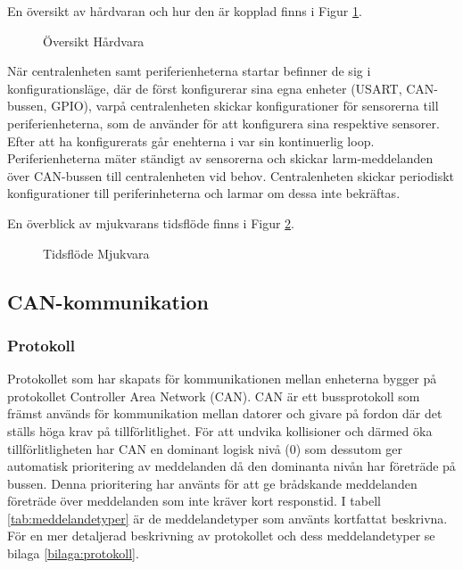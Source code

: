 \documentclass{article}
\begin{document}
En översikt av hårdvaran och hur den är kopplad finns i Figur \ref{fig:hårdvara}.
\begin{figure}[H] %
    \centering
    \caption{Översikt Hårdvara}
    \label{fig:hårdvara}
\end{figure}

När centralenheten samt periferienheterna startar befinner de sig i konfigurationsläge, där de först konfigurerar sina egna enheter 
 (USART, CAN-bussen, GPIO), varpå centralenheten skickar konfigurationer för sensorerna till periferienheterna, som de använder för att konfigurera sina respektive sensorer. Efter att ha konfigurerats går enehterna i var sin kontinuerlig loop. Periferienheterna mäter ständigt av sensorerna och skickar larm-meddelanden över CAN-bussen till centralenheten vid behov. Centralenheten skickar periodiskt konfigurationer till periferinheterna och larmar om dessa inte bekräftas.

En överblick av mjukvarans tidsflöde finns i Figur \ref{fig:tidsflöde}.

\begin{figure}[H]
    \centering
    \caption{Tidsflöde Mjukvara}
    \label{fig:tidsflöde}
\end{figure}


\subsection{CAN-kommunikation}
\label{can}
\subsubsection{Protokoll}
Protokollet som har skapats för kommunikationen mellan enheterna bygger på protokollet Controller Area Network (CAN).
CAN är ett bussprotokoll som främst används för kommunikation mellan datorer och givare på fordon där det ställs höga krav på tillförlitlighet.
För att undvika kollisioner och därmed öka tillförlitligheten har CAN en dominant logisk nivå (0) som dessutom ger automatisk prioritering av meddelanden då den dominanta nivån har företräde på bussen.
Denna prioritering har använts för att ge brådskande meddelanden företräde över meddelanden som inte kräver kort responstid. I tabell \ref{tab:meddelandetyper} är de meddelandetyper som använts kortfattat beskrivna. För en mer detaljerad beskrivning av protokollet och dess meddelandetyper se bilaga \ref{bilaga:protokoll}.
\end{document}
